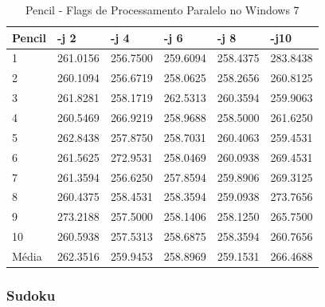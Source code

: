 \begin{table}[!ht]
\centering
\caption{Pencil - Flags de Processamento Paralelo no Windows 7}
\label{tab:flag_processamento_paralelo:windows:pencil}
\begin{tabular}{llllll}
\textbf{Pencil} & \textbf{-j 2} & \textbf{-j 4} & \textbf{-j 6} & \textbf{-j 8} & \textbf{-j10}  \\ \toprule
1               & 261.0156  &   256.7500 &    259.6094   &  258.4375 &    283.8438           \\ 
2               & 260.1094  &   256.6719 &    258.0625   &  258.2656 &    260.8125           \\ 
3               & 261.8281  &   258.1719 &    262.5313   &  260.3594 &    259.9063           \\ 
4               & 260.5469  &   266.9219 &    258.9688   &  258.5000 &    261.6250           \\ 
5               & 262.8438  &   257.8750 &    258.7031   &  260.4063 &    259.4531           \\ 
6               & 261.5625  &   272.9531 &    258.0469   &  260.0938 &    269.4531           \\ 
7               & 261.3594  &   256.6250 &    257.8594   &  259.8906 &    269.3125           \\ 
8               & 260.4375  &   258.4531 &    258.3594   &  259.0938 &    273.7656           \\ 
9               & 273.2188  &   257.5000 &    258.1406   &  258.1250 &    265.7500           \\ 
10              & 260.5938  &   257.5313 &    258.6875   &  258.3594 &    260.7656           \\ \bottomrule
Média           & 262.3516  &   259.9453 &    258.8969   &  259.1531 &    266.4688           \\ 
\end{tabular}
\end{table}

\clearpage
\subsubsection*{Sudoku}

